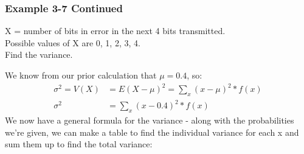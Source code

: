 \documentclass[../INDE315.tex]{subfiles}
\begin{document}
\subsubsection*{Example 3-7 Continued}
\begin{exmp}
    X = number of bits in error in the next 4 bits transmitted. \\
    Possible values of X are {0, 1, 2, 3, 4}. \\
    Find the variance.
\end{exmp}
We know from our prior calculation that $\mu = 0.4$, so:
\begin{equation*}
    \begin{aligned}
        \sigma ^2 = V(X) &= E(X - \mu)^2 = \sum_x (x - \mu)^2 * f(x) \\
        \sigma ^2        &= \sum_x (x - 0.4)^2 * f(x)
    \end{aligned}
\end{equation*} 
We now have a general formula for the variance - along with the probabilities we're given, we can make a table to find the individual variance for each x and sum them up to find the total variance:
\end{document}
